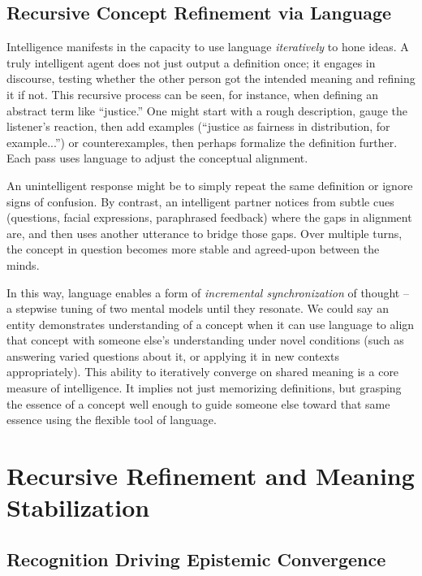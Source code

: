 \documentclass{article}
\begin{document}
\subsection{Recursive Concept Refinement via Language}

Intelligence manifests in the capacity to use language \emph{iteratively} to hone ideas. A truly intelligent agent does not just output a definition once; it engages in discourse, testing whether the other person got the intended meaning and refining it if not. This recursive process can be seen, for instance, when defining an abstract term like ``justice.'' One might start with a rough description, gauge the listener's reaction, then add examples (``justice as fairness in distribution, for example...'') or counterexamples, then perhaps formalize the definition further. Each pass uses language to adjust the conceptual alignment.

An unintelligent response might be to simply repeat the same definition or ignore signs of confusion. By contrast, an intelligent partner notices from subtle cues (questions, facial expressions, paraphrased feedback) where the gaps in alignment are, and then uses another utterance to bridge those gaps. Over multiple turns, the concept in question becomes more stable and agreed-upon between the minds.

In this way, language enables a form of \emph{incremental synchronization} of thought -- a stepwise tuning of two mental models until they resonate. We could say an entity demonstrates understanding of a concept when it can use language to align that concept with someone else's understanding under novel conditions (such as answering varied questions about it, or applying it in new contexts appropriately). This ability to iteratively converge on shared meaning is a core measure of intelligence. It implies not just memorizing definitions, but grasping the essence of a concept well enough to guide someone else toward that same essence using the flexible tool of language.

\section{Recursive Refinement and Meaning Stabilization}

\subsection{Recognition Driving Epistemic Convergence}
\end{document}

